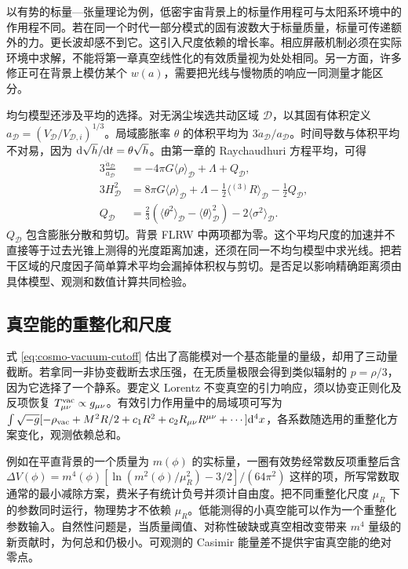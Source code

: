 以有势的标量—张量理论为例，低密宇宙背景上的标量作用程可与太阳系环境中的作用程不同。若在同一个时代一部分模式的固有波数大于标量质量，标量可传递额外的力。更长波却感不到它。这引入尺度依赖的增长率。相应屏蔽机制必须在实际环境中求解，不能将第一章真空线性化的有效质量视为处处相同。另一方面，许多修正可在背景上模仿某个 $w(a)$，需要把光线与慢物质的响应一同测量才能区分。

均匀模型还涉及平均的选择。对无涡尘埃选共动区域 $\mathcal D$，以其固有体积定义 $a_\mathcal D=(V_\mathcal D/V_{\mathcal D,i})^{1/3}$。局域膨胀率 $\theta$ 的体积平均为 $3\dot a_\mathcal D/a_\mathcal D$。时间导数与体积平均不对易，因为 $\dd\sqrt h/\dd t=\theta\sqrt h$。由第一章的 Raychaudhuri 方程平均，可得
\begin{align*}
 3\frac{\ddot a_\mathcal D}{a_\mathcal D}
    &=-4\pi G\langle\rho\rangle_\mathcal D+\Lambda+Q_\mathcal D,\\
 3H_\mathcal D^2
    &=8\pi G\langle\rho\rangle_\mathcal D+\Lambda
       -\frac12\langle{}^{(3)}R\rangle_\mathcal D-\frac12Q_\mathcal D,\\
 Q_\mathcal D&=\frac23(\langle\theta^2\rangle_\mathcal D
             -\langle\theta\rangle_\mathcal D^2)-2\langle\sigma^2\rangle_\mathcal D .
\end{align*}
$Q_\mathcal D$ 包含膨胀分散和剪切。背景 FLRW 中两项都为零。这个平均尺度的加速并不直接等于过去光锥上测得的光度距离加速，还须在同一不均匀模型中求光线。把若干区域的尺度因子简单算术平均会漏掉体积权与剪切。是否足以影响精确距离须由具体模型、观测和数值计算共同检验。
\subsection{真空能的重整化和尺度}

式 \eqref{eq:cosmo-vacuum-cutoff} 估出了高能模对一个基态能量的量级，却用了三动量截断。若拿同一非协变截断去求压强，在无质量极限会得到类似辐射的 $p=\rho/3$，因为它选择了一个静系。要定义 Lorentz 不变真空的引力响应，须以协变正则化及反项恢复 $T_{\mu\nu}^{\rm vac}\propto g_{\mu\nu}$。有效引力作用量中的局域项可写为 $\int\sqrt{-g}[-\rho_{\rm vac}+M^2R/2+c_1R^2+c_2R_{\mu\nu}R^{\mu\nu}+\cdots]\dd^4x$，各系数随选用的重整化方案变化，观测依赖总和。

例如在平直背景的一个质量为 $m(\phi)$ 的实标量，一圈有效势经常数反项重整后含 $\Delta V(\phi)=m^4(\phi)[\ln(m^2(\phi)/\mu_R^2)-3/2]/(64\pi^2)$ 这样的项，所写常数取通常的最小减除方案，费米子有统计负号并须计自由度。把不同重整化尺度 $\mu_R$ 下的参数同时运行，物理势才不依赖 $\mu_R$。低能测得的小真空能可以作为一个重整化参数输入。自然性问题是，当质量阈值、对称性破缺或真空相改变带来 $m^4$ 量级的新贡献时，为何总和仍极小。可观测的 Casimir 能量差不提供宇宙真空能的绝对零点。

